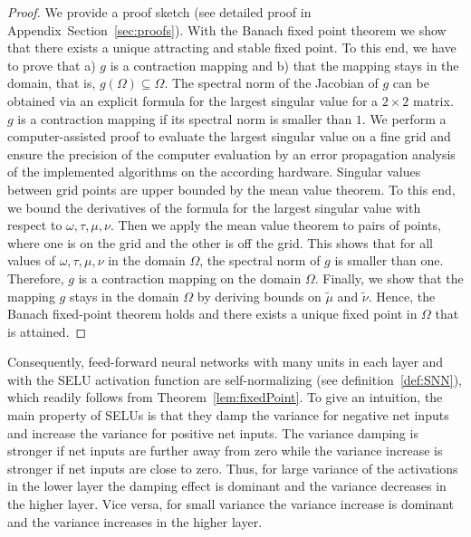 \documentclass{article}
\newcommand\munn{{\tilde \mu}}
\newcommand\nunn{{\tilde \nu}}
\begin{document}
\begin{proof} 
We provide a proof sketch (see detailed proof in Appendix~Section~\ref{sec:proofs}).
With the Banach fixed point theorem we show that there exists
a unique attracting and stable fixed point. 
To this end, we have to prove that  a) $g$ is a contraction mapping and b) that 
the mapping stays in the domain, that is, $g(\Omega)  \subseteq \Omega$. 
The spectral norm of the Jacobian of $g$ can be obtained via 
an explicit formula for the largest singular value for a $2\times2$ matrix. 
$g$ is a contraction mapping if its spectral norm is smaller than $1$.
We perform a computer-assisted proof to 
evaluate the largest singular value on a fine
grid and ensure the precision of the computer 
evaluation by an error propagation analysis of the implemented
algorithms on the according hardware.
Singular values between grid points are upper bounded by the 
mean value theorem. To this end, we bound the derivatives
of the formula for the largest singular value with respect to
$\omega,\tau,\mu,\nu$. 
Then we apply the mean value theorem to pairs of points, where one is on the grid and the
other is off the grid. This shows that for all values of
$\omega,\tau,\mu,\nu$ in  the domain $\Omega$, the spectral norm of
$g$ is smaller than one. 
Therefore, $g$ is a contraction mapping on the domain $\Omega$.
Finally, we show that the mapping $g$ stays in the domain $\Omega$ by
deriving bounds on $\munn$ and $\nunn$.
Hence, the Banach fixed-point theorem holds and there exists a unique
fixed point in $\Omega$ that is attained.
\end{proof}

Consequently, feed-forward neural networks with many units in each layer 
and with the SELU activation function are self-normalizing (see definition~\ref{def:SNN}), which 
readily follows from Theorem~\ref{lem:fixedPoint}.
To give an intuition, the main property of SELUs is that they damp the variance for negative
net inputs and increase the variance for positive net inputs. 
The variance damping is stronger if net inputs are further away from zero while
the variance increase is stronger if net inputs are close to zero.
Thus, for large variance of the activations in the lower
layer the damping effect is dominant and the variance decreases in the
higher layer.
Vice versa, for small variance the 
variance increase is dominant and the variance increases in the higher layer.
\end{document}
